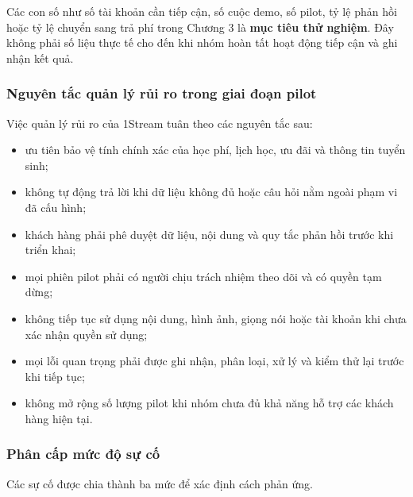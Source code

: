 Các con số như số tài khoản cần tiếp cận, số cuộc demo, số pilot, tỷ lệ phản hồi hoặc tỷ lệ chuyển sang trả phí trong Chương 3 là \textbf{mục tiêu thử nghiệm}. Đây không phải số liệu thực tế cho đến khi nhóm hoàn tất hoạt động tiếp cận và ghi nhận kết quả.

\subsubsection{Nguyên tắc quản lý rủi ro trong giai đoạn pilot}

Việc quản lý rủi ro của 1Stream tuân theo các nguyên tắc sau:

\begin{itemize}
    \item ưu tiên bảo vệ tính chính xác của học phí, lịch học, ưu đãi và thông tin tuyển sinh;
    \item không tự động trả lời khi dữ liệu không đủ hoặc câu hỏi nằm ngoài phạm vi đã cấu hình;
    \item khách hàng phải phê duyệt dữ liệu, nội dung và quy tắc phản hồi trước khi triển khai;
    \item mọi phiên pilot phải có người chịu trách nhiệm theo dõi và có quyền tạm dừng;
    \item không tiếp tục sử dụng nội dung, hình ảnh, giọng nói hoặc tài khoản khi chưa xác nhận quyền sử dụng;
    \item mọi lỗi quan trọng phải được ghi nhận, phân loại, xử lý và kiểm thử lại trước khi tiếp tục;
    \item không mở rộng số lượng pilot khi nhóm chưa đủ khả năng hỗ trợ các khách hàng hiện tại.
\end{itemize}

\subsubsection{Phân cấp mức độ sự cố}

Các sự cố được chia thành ba mức để xác định cách phản ứng.

